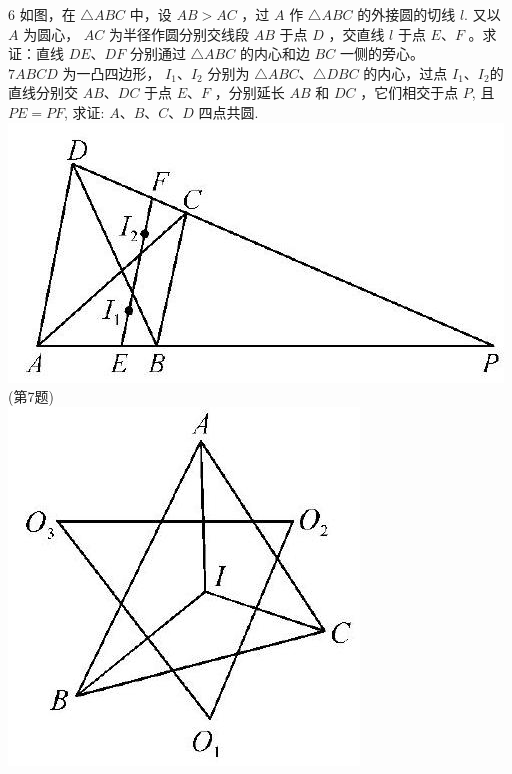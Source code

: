 \documentclass[10pt]{article}
\begin{document}
6 如图，在 $\triangle A B C$ 中，设 $A B>A C$ ，过 $A$ 作 $\triangle A B C$ 的外接圆的切线 $l$. 又以 $A$ 为圆心， $A C$ 为半径作圆分别交线段 $A B$ 于点 $D$ ，交直线 $l$ 于点 $E 、 F$ 。求证：直线 $D E 、 D F$ 分别通过 $\triangle A B C$ 的内心和边 $B C$ 一侧的旁心。\\
$7 A B C D$ 为一凸四边形， $I_{1} 、 I_{2}$ 分别为 $\triangle A B C 、 \triangle D B C$ 的内心，过点 $I_{1} 、 I_{2}$的直线分别交 $A B 、 D C$ 于点 $E 、 F$ ，分别延长 $A B$ 和 $D C$ ，它们相交于点 $P$, 且 $P E=P F$, 求证: $A 、 B 、 C 、 D$ 四点共圆.\\
\includegraphics[max width=\textwidth, center]{2024_10_30_66b8e5e701da2093c133g-078(2)}\\
(第7题)\\
\includegraphics[max width=\textwidth, center]{2024_10_30_66b8e5e701da2093c133g-078(1)}\\
\end{document}
